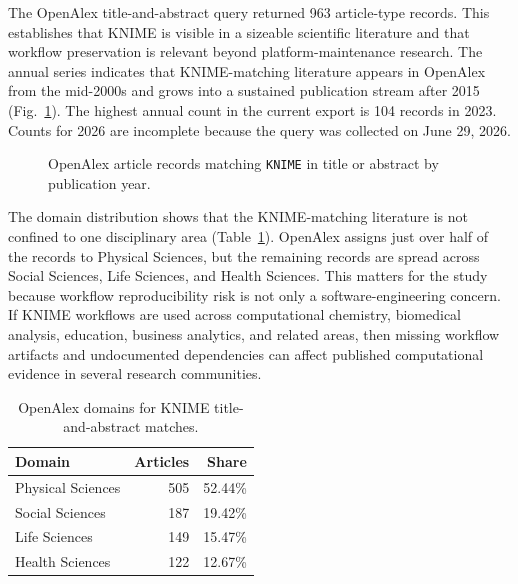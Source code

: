 \documentclass[runningheads]{llncs}
\begin{document}
The OpenAlex title-and-abstract query returned 963 article-type records. This
establishes that KNIME is visible in a sizeable scientific literature and that
workflow preservation is relevant beyond platform-maintenance research. The
annual series indicates that KNIME-matching literature appears in OpenAlex
from the mid-2000s and grows into a
sustained publication stream after 2015 (Fig.~\ref{fig:openalex-by-year}). The
highest annual count in the current export is 104 records in 2023. Counts for
2026 are incomplete because the query was collected on June 29, 2026.

\begin{figure}
\centering
{}
\caption{OpenAlex article records matching \texttt{KNIME} in title or
abstract by publication year.}
\label{fig:openalex-by-year}
\end{figure}

The domain distribution shows that the KNIME-matching literature is not
confined to one disciplinary area (Table~\ref{tab:openalex-domains}). OpenAlex
assigns just over half of the records to Physical Sciences, but the remaining
records are spread across Social Sciences, Life Sciences, and Health Sciences.
This matters for the study because workflow reproducibility risk is not only a
software-engineering concern. If KNIME workflows are used across computational
chemistry, biomedical analysis, education, business analytics, and related
areas, then missing workflow artifacts and undocumented dependencies can
affect published computational evidence in several research communities.

\begin{table}
\centering
\caption{OpenAlex domains for KNIME title-and-abstract matches.}
\label{tab:openalex-domains}
\begin{tabular}{lrr}
\toprule
Domain & Articles & Share \\
\midrule
Physical Sciences & 505 & 52.44\% \\
Social Sciences & 187 & 19.42\% \\
Life Sciences & 149 & 15.47\% \\
Health Sciences & 122 & 12.67\% \\
\bottomrule
\end{tabular}
\end{table}
\end{document}
